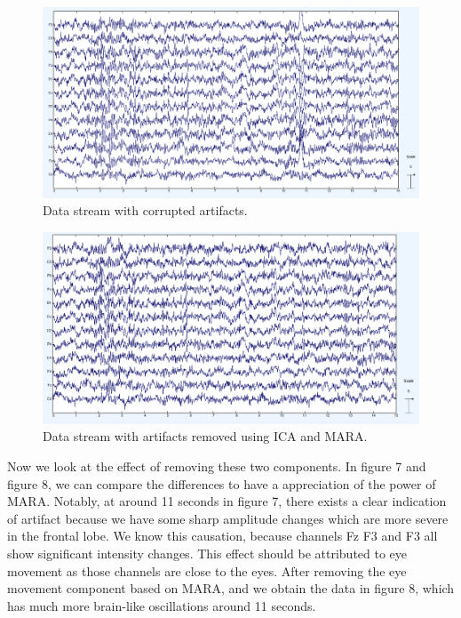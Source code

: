 \documentclass[a4paper,11pt,oneside]{article}
\begin{document}
		\begin{figure}[!h]
			\begin{center}
				\includegraphics[width=\textwidth]{img/art}
			\end{center}
			\caption{Data stream with corrupted artifacts.}
		\end{figure}
				\begin{figure}[!h]
		\begin{center}
			\includegraphics[width=\textwidth]{img/artrm}
		\end{center}
		\caption{Data stream with artifacts removed using ICA and MARA.}
	\end{figure}
	Now we look at the effect of removing these two components. In figure 7 and figure 8, we can compare the differences to have a appreciation of the power of MARA. Notably, at around 11 seconds in figure 7, there exists a clear indication of artifact because we have some sharp amplitude changes which are more severe in the frontal lobe. We know this causation, because channels Fz F3 and F3 all show significant intensity changes. This effect should be attributed to eye movement as those channels are close to the eyes. After removing the eye movement component based on MARA, and we obtain the data in figure 8, which has much more brain-like oscillations around 11 seconds.
	
\end{document}

